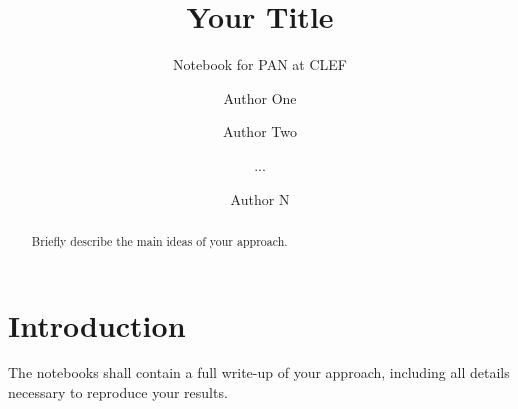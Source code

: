 \documentclass{llncs}
\begin{document}
	
{\let\thefootnote\relax{}}

\title{Your Title}
\subtitle{Notebook for PAN at CLEF \the\year}

\author{Author One \and Author Two \and ... \and Author N}

\maketitle

\begin{abstract}
Briefly describe the main ideas of your approach.
\end{abstract}


\section{Introduction}

The notebooks shall contain a full write-up of your approach, including all details necessary to reproduce your results.




\begin{raggedright}

\end{raggedright}
\end{document}
